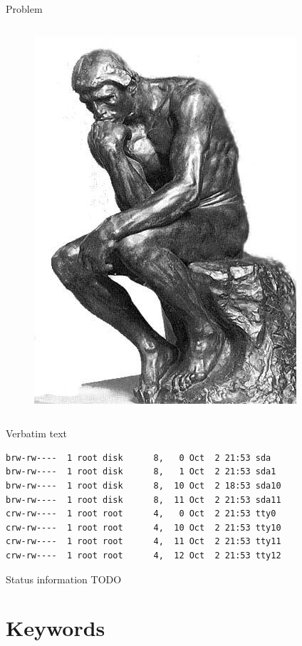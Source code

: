 \documentclass{soa.cs.pub.ro}
\begin{document}
\begin{frame}{Problem}
\begin{columns}
\begin{column}[l]{0.45\textwidth}
\begin{figure}
         \includegraphics[scale=0.25]{img/thinker.jpg}
      \end{figure}
    \end{column}
  \end{columns}
\end{frame}

\begin{frame}[fragile]{Verbatim text}
  \pause
  \footnotesize
  \begin{verbatim}
brw-rw----  1 root disk      8,   0 Oct  2 21:53 sda
brw-rw----  1 root disk      8,   1 Oct  2 21:53 sda1
brw-rw----  1 root disk      8,  10 Oct  2 18:53 sda10
brw-rw----  1 root disk      8,  11 Oct  2 21:53 sda11
crw-rw----  1 root root      4,   0 Oct  2 21:53 tty0
crw-rw----  1 root root      4,  10 Oct  2 21:53 tty10
crw-rw----  1 root root      4,  11 Oct  2 21:53 tty11
crw-rw----  1 root root      4,  12 Oct  2 21:53 tty12
  \end{verbatim}
\end{frame}

\begin{frame}{Status information}
  TODO
\end{frame}

\section{Keywords}
\end{document}
